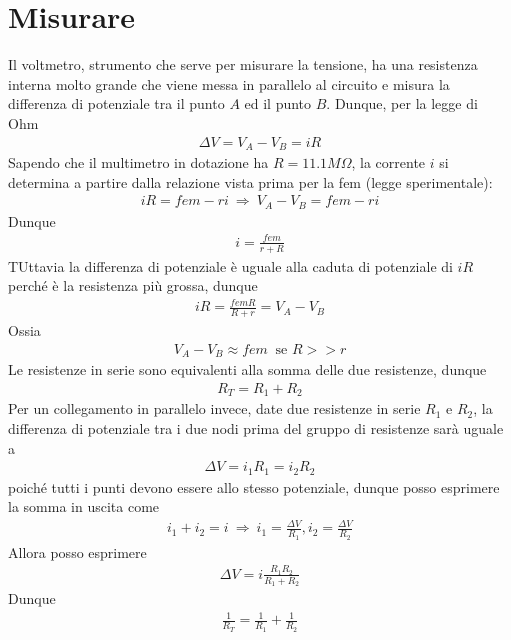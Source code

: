 \documentclass[a4paper, oneside]{article}
\begin{document}
\section{Misurare}
Il voltmetro, strumento che serve per misurare la tensione, ha una resistenza 
interna molto grande che viene messa in parallelo al circuito e misura la
differenza di potenziale tra il punto $A$ ed il punto $B$. Dunque, per la legge di Ohm
\begin{gather*}
    \Delta V = V_A - V_B = iR
\end{gather*}
Sapendo che il multimetro in dotazione ha $R = 11.1 M\Omega$, la corrente $i$ si determina a partire dalla 
relazione vista prima per la fem (legge sperimentale):
\begin{gather*}
    iR = fem - ri \ \Longrightarrow \ V_A - V_B = fem - ri
\end{gather*} 
Dunque
\begin{gather*}
    i = \frac{fem}{r + R}
\end{gather*}
TUttavia la differenza di potenziale è uguale alla caduta di potenziale di $iR$
perché è la resistenza più grossa, dunque
\begin{gather*}
    iR = \frac{fem R}{R + r} = V_A - V_B
\end{gather*}
Ossia
\begin{gather*}
    V_A - V_B  \approx fem \ \text{ se } R >> r
\end{gather*}
Le resistenze in serie sono equivalenti alla somma delle due resistenze, dunque
\begin{gather*}
    R_T = R_1 + R_2
\end{gather*}
Per un collegamento in parallelo invece, date due resistenze in serie
$R_1$ e $R_2$, la differenza di potenziale tra i due nodi prima del gruppo di resistenze
sarà uguale a 
\begin{gather*}
    \Delta V = i_1 R_1 = i_2 R_2
\end{gather*}
poiché tutti i punti devono essere allo stesso potenziale, dunque posso esprimere 
la somma in uscita come 
\begin{gather*}
    i_1 + i_2 = i \ \Longrightarrow \ i_1 = \frac{\Delta V}{R_1} , i_2 = \frac{\Delta V}{R_2}
\end{gather*}
Allora posso esprimere
\begin{gather*}
    \Delta V = i \frac{R_1 R_2}{R_1 + R_2}
\end{gather*}
Dunque
\begin{gather*}
    \frac{1}{R_T} = \frac{1}{R_1} + \frac{1}{R_2}
\end{gather*}
\end{document}
